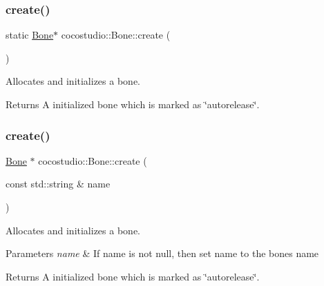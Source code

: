 \subsubsection{\texorpdfstring{create()}{create()}\hspace{0.1cm}{\footnotesize\ttfamily [2/4]}}
{\footnotesize\ttfamily static \hyperlink{classcocostudio_1_1Bone}{Bone}$\ast$ cocostudio\+::\+Bone\+::create (\begin{DoxyParamCaption}{ }\end{DoxyParamCaption})\hspace{0.3cm}{\ttfamily [static]}}

Allocates and initializes a bone. \begin{DoxyReturn}{Returns}
A initialized bone which is marked as \char`\"{}autorelease\char`\"{}. 
\end{DoxyReturn}
\mbox{\label{classcocostudio_1_1Bone_a45a1c12c432edb58c992d696e679ccd9}} 
\subsubsection{\texorpdfstring{create()}{create()}\hspace{0.1cm}{\footnotesize\ttfamily [3/4]}}
{\footnotesize\ttfamily \hyperlink{classcocostudio_1_1Bone}{Bone} $\ast$ cocostudio\+::\+Bone\+::create (\begin{DoxyParamCaption}\item[{const std\+::string \&}]{name }\end{DoxyParamCaption})\hspace{0.3cm}{\ttfamily [static]}}

Allocates and initializes a bone.


\begin{DoxyParams}{Parameters}
{\em name} & If name is not null, then set name to the bone\textquotesingle{}s name \\
\hline
\end{DoxyParams}
\begin{DoxyReturn}{Returns}
A initialized bone which is marked as \char`\"{}autorelease\char`\"{}. 
\end{DoxyReturn}
\mbox{\label{classcocostudio_1_1Bone_a1266563e2cf707ae62e3de45778e2681}} 
